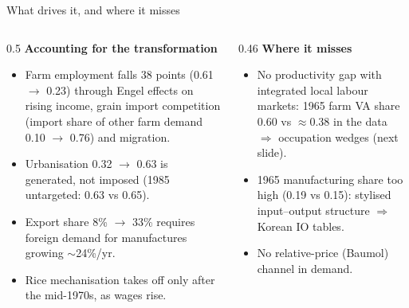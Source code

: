 \documentclass[10pt,aspectratio=169]{beamer}
\newcommand{\hl}[1]{\textcolor{mOrange}{#1}}
\begin{document}
\begin{frame}{What drives it, and where it misses}
  \begin{columns}[T]
    \begin{column}{0.5\textwidth}
      \textbf{Accounting for the transformation}
      \begin{itemize}\small
        \item Farm employment falls 38 points (0.61 $\to$ 0.23) through \hl{Engel effects}
              on rising income, \hl{grain import competition} (import share of other farm
              demand 0.10 $\to$ 0.76) and \hl{migration}.
        \item Urbanisation 0.32 $\to$ 0.63 is generated, not imposed (1985 untargeted:
              0.63 vs 0.65).
        \item Export share 8\% $\to$ 33\% requires foreign demand for manufactures growing
              $\sim$24\%/yr.
        \item Rice mechanisation takes off only after the mid-1970s, as wages rise.
      \end{itemize}
    \end{column}
    \begin{column}{0.46\textwidth}
      \textbf{Where it misses}
      \begin{itemize}\small
        \item \hl{No productivity gap} with integrated local labour markets: 1965 farm VA
              share 0.60 vs $\approx$0.38 in the data $\Rightarrow$ occupation wedges
              (next slide).
        \item 1965 manufacturing share too high (0.19 vs 0.15): stylised input--output
              structure $\Rightarrow$ Korean IO tables.
        \item No relative-price (Baumol) channel in demand.
      \end{itemize}
    \end{column}
  \end{columns}
\end{frame}
\end{document}

